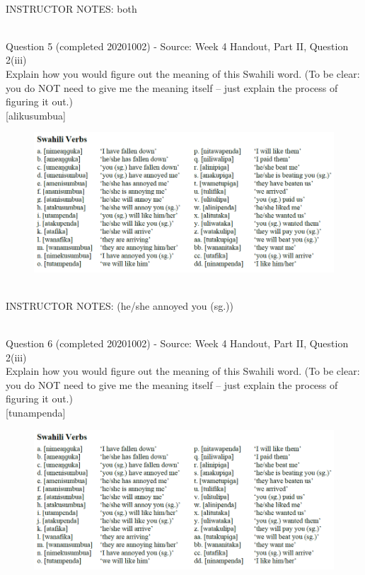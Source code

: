 \documentclass[12pt]{article}
\begin{document}
~\\
INSTRUCTOR NOTES: both


~\\

{\large Question 5} (completed 20201002) - Source: Week 4 Handout, Part II, Question 2(iii)\\

Explain how you would figure out the meaning of this Swahili word. (To be clear: you do NOT need to give me the meaning itself -- just explain the process of figuring it out.)\\

{[alikusumbua]}

\begin{figure}[H]
\includegraphics{../images/swahiliverbs.png}
\end{figure}

~\\
INSTRUCTOR NOTES: (he/she annoyed you (sg.))


~\\

{\large Question 6} (completed 20201002) - Source: Week 4 Handout, Part II, Question 2(iii)\\

Explain how you would figure out the meaning of this Swahili word. (To be clear: you do NOT need to give me the meaning itself -- just explain the process of figuring it out.)\\

{[tunampenda]}

\begin{figure}[H]
\includegraphics{../images/swahiliverbs.png}
\end{figure}
\end{document}
